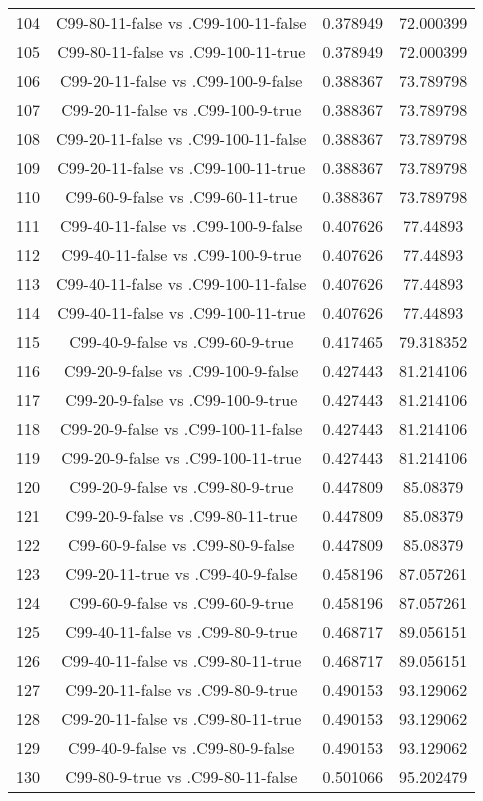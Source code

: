 \documentclass[a4paper,10pt]{article}
\begin{document}
\begin{landscape}
\begin{table}[!htp]
\begin{tabular}{cccc}
104&C99-80-11-false vs .C99-100-11-false&0.378949&72.000399\\
105&C99-80-11-false vs .C99-100-11-true&0.378949&72.000399\\
106&C99-20-11-false vs .C99-100-9-false&0.388367&73.789798\\
107&C99-20-11-false vs .C99-100-9-true&0.388367&73.789798\\
108&C99-20-11-false vs .C99-100-11-false&0.388367&73.789798\\
109&C99-20-11-false vs .C99-100-11-true&0.388367&73.789798\\
110&C99-60-9-false vs .C99-60-11-true&0.388367&73.789798\\
111&C99-40-11-false vs .C99-100-9-false&0.407626&77.44893\\
112&C99-40-11-false vs .C99-100-9-true&0.407626&77.44893\\
113&C99-40-11-false vs .C99-100-11-false&0.407626&77.44893\\
114&C99-40-11-false vs .C99-100-11-true&0.407626&77.44893\\
115&C99-40-9-false vs .C99-60-9-true&0.417465&79.318352\\
116&C99-20-9-false vs .C99-100-9-false&0.427443&81.214106\\
117&C99-20-9-false vs .C99-100-9-true&0.427443&81.214106\\
118&C99-20-9-false vs .C99-100-11-false&0.427443&81.214106\\
119&C99-20-9-false vs .C99-100-11-true&0.427443&81.214106\\
120&C99-20-9-false vs .C99-80-9-true&0.447809&85.08379\\
121&C99-20-9-false vs .C99-80-11-true&0.447809&85.08379\\
122&C99-60-9-false vs .C99-80-9-false&0.447809&85.08379\\
123&C99-20-11-true vs .C99-40-9-false&0.458196&87.057261\\
124&C99-60-9-false vs .C99-60-9-true&0.458196&87.057261\\
125&C99-40-11-false vs .C99-80-9-true&0.468717&89.056151\\
126&C99-40-11-false vs .C99-80-11-true&0.468717&89.056151\\
127&C99-20-11-false vs .C99-80-9-true&0.490153&93.129062\\
128&C99-20-11-false vs .C99-80-11-true&0.490153&93.129062\\
129&C99-40-9-false vs .C99-80-9-false&0.490153&93.129062\\
130&C99-80-9-true vs .C99-80-11-false&0.501066&95.202479\\

\end{tabular}
\end{table}
\end{landscape}
\end{document}
